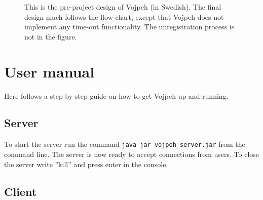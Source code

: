 \documentclass[a4paper,titlepage]{article}
\newcommand{\code}{\texttt}
\begin{document}
\begin{figure}[hp]
\centering
{}
\caption{This is the pre-project design of Vojpeh (in Swedish). The final design much follows the flow chart, except that Vojpeh does not implement any time-out functionality. The unregistration process is not in the figure.}
\label{micro}
\end{figure}

\section{User manual}
Here follows a step-by-step guide on how to get Vojpeh up and running.
\subsection*{Server}
To start the server run the command \code{java \-jar vojpeh\_server.jar} from the command line. The server is now ready to accept connections from users. To close the server write ''kill'' and press enter in the console.

\subsection*{Client}
\end{document}
